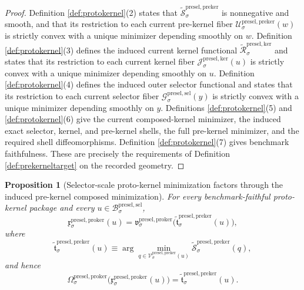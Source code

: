 \documentclass[11pt]{article}
\newcommand{\PreSectionSelectorBody}[1]{\mathcal B_{#1}^{\mathrm{presel,sel}}}
\newcommand{\PreSectionSelectorFiber}[2]{\mathcal G_{#1}^{\mathrm{presel,sel}}(#2)}
\newcommand{\KernelFiber}[2]{\mathcal J_{#1}^{\mathrm{presel,ker}}(#2)}
\newcommand{\PreKernelFiber}[2]{\mathcal U_{#1}^{\mathrm{presel,preker}}(#2)}
\newcommand{\PreKernelComposedFiber}[2]{\mathcal V_{#1}^{\mathrm{presel,preker}}(#2)}
\newcommand{\ProtoKernelProj}[1]{\Omega_{#1}^{\mathrm{presel,proker}}}
\newcommand{\ProtoKernelMinLift}[1]{\mathfrak v_{#1}^{\mathrm{presel,proker}}}
\newcommand{\ProtoKernelSelectorMin}[1]{\mathfrak x_{#1}^{\mathrm{presel,proker}}}
\newcommand{\InducedKernelFunctional}[1]{\widetilde{\mathscr R}_{#1}^{\mathrm{presel,ker}}}
\newcommand{\InducedPreKernelFunctional}[1]{\widetilde{\mathscr S}_{#1}^{\mathrm{presel,preker}}}
\newcommand{\InducedPreKernelComposedMin}[1]{\widetilde{\mathfrak t}_{#1}^{\mathrm{presel,preker}}}
\newtheorem{proposition}{Proposition}
\begin{document}
\begin{proof}
Definition \ref{def:protokernel}(2) states that \(\InducedPreKernelFunctional{\sigma}\) is nonnegative and smooth, and that its restriction to each current pre-kernel fiber \(\PreKernelFiber{\sigma}{w}\) is strictly convex with a unique minimizer depending smoothly on \(w\). Definition \ref{def:protokernel}(3) defines the induced current kernel functional \(\InducedKernelFunctional{\sigma}\) and states that its restriction to each current kernel fiber \(\KernelFiber{\sigma}{u}\) is strictly convex with a unique minimizer depending smoothly on \(u\). Definition \ref{def:protokernel}(4) defines the induced outer selector functional and states that its restriction to each current selector fiber \(\PreSectionSelectorFiber{\sigma}{y}\) is strictly convex with a unique minimizer depending smoothly on \(y\). Definitions \ref{def:protokernel}(5) and \ref{def:protokernel}(6) give the current composed-kernel minimizer, the induced exact selector, kernel, and pre-kernel shells, the full pre-kernel minimizer, and the required shell diffeomorphisms. Definition \ref{def:protokernel}(7) gives benchmark faithfulness. These are precisely the requirements of Definition \ref{def:prekerneltarget} on the recorded geometry.
\end{proof}

\begin{proposition}[Selector-scale proto-kernel minimization factors through the induced pre-kernel composed minimization]
\label{prop:selectorfactor}
For every benchmark-faithful proto-kernel package and every \(u\in\PreSectionSelectorBody{\sigma}\),
\[
\ProtoKernelSelectorMin{\sigma}(u)
=
\ProtoKernelMinLift{\sigma}\bigl(\InducedPreKernelComposedMin{\sigma}(u)\bigr),
\]
where
\[
\InducedPreKernelComposedMin{\sigma}(u)
\equiv
\arg\min_{q\in\PreKernelComposedFiber{\sigma}{u}}
\InducedPreKernelFunctional{\sigma}(q),
\]
and hence
\[
\ProtoKernelProj{\sigma}\bigl(\ProtoKernelSelectorMin{\sigma}(u)\bigr)
=
\InducedPreKernelComposedMin{\sigma}(u).
\]
\end{proposition}
\end{document}
